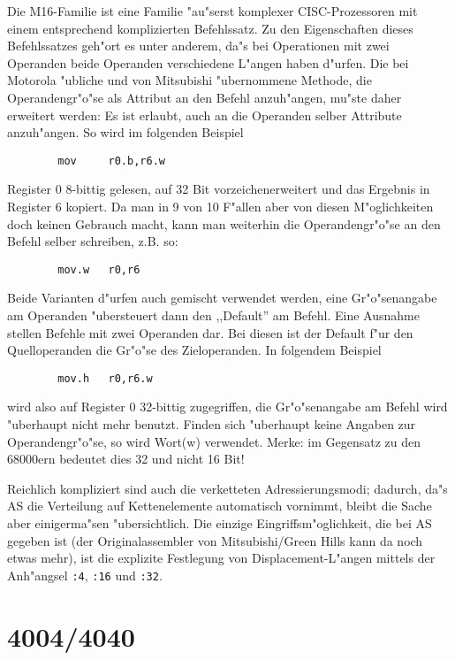 \documentclass[12pt,a4paper,twoside]{report}
\newcommand{\tty}[1]{{\tt #1}}
\begin{document}
Die M16-Familie ist eine Familie "au"serst komplexer CISC-Prozessoren
mit einem entsprechend komplizierten Befehlssatz.  Zu den Eigenschaften
dieses Befehlssatzes geh"ort es unter anderem, da"s bei Operationen
mit zwei Operanden beide Operanden verschiedene L"angen haben d"urfen.
Die bei Motorola "ubliche und von Mitsubishi "ubernommene Methode, die
Operandengr"o"se als Attribut an den Befehl anzuh"angen, mu"ste daher
erweitert werden: Es ist erlaubt, auch an die Operanden selber Attribute
anzuh"angen.  So wird im folgenden Beispiel
\begin{verbatim}
        mov     r0.b,r6.w
\end{verbatim}
Register 0 8-bittig gelesen, auf 32 Bit vorzeichenerweitert und das
Ergebnis in Register 6 kopiert.  Da man in 9 von 10 F"allen aber von
diesen M"oglichkeiten doch keinen Gebrauch macht, kann man weiterhin
die Operandengr"o"se an den Befehl selber schreiben, z.B. so:
\begin{verbatim}
        mov.w   r0,r6
\end{verbatim}
Beide Varianten d"urfen auch gemischt verwendet werden, eine
Gr"o"senangabe am Operanden "ubersteuert dann den ,,Default'' am Befehl.
Eine Ausnahme stellen Befehle mit zwei Operanden dar.   Bei diesen ist
der Default f"ur den Quelloperanden die Gr"o"se des Zieloperanden. In
folgendem Beispiel
\begin{verbatim}
        mov.h   r0,r6.w
\end{verbatim}
wird also auf Register 0 32-bittig zugegriffen, die Gr"o"senangabe
am Befehl wird "uberhaupt nicht mehr benutzt.  Finden sich "uberhaupt
keine Angaben zur Operandengr"o"se, so wird Wort(w) verwendet.  Merke:
im Gegensatz zu den 68000ern bedeutet dies 32 und nicht 16 Bit!
\par
Reichlich kompliziert sind auch die verketteten Adressierungsmodi;
dadurch, da"s AS die Verteilung auf Kettenelemente automatisch
vornimmt, bleibt die Sache aber einigerma"sen "ubersichtlich.  Die
einzige Eingriffsm"oglichkeit, die bei AS gegeben ist (der Originalassembler
von Mitsubishi/Green Hills kann da noch etwas mehr), ist die explizite
Festlegung von Displacement-L"angen mittels der Anh"angsel \tty{:4},
\tty{:16} und \tty{:32}.


\section{4004/4040}
\end{document}
